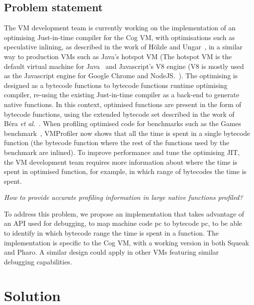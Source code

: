\documentclass[10pt,preprint,nonatbib]{sigplanconf}
\newcommand{\etal}{\emph{et al.}\xspace}
\begin{document}
\subsection{Problem statement}

The VM development team is currently working on the implementation of an optimising Just-in-time compiler for the Cog VM, with optimisations such as speculative inlining, as described in the work of H\"olzle and Ungar~\cite{Holz94a}, in a similar way to production VMs such as Java's hotspot VM (The hotspot VM is the default virtual machine for Java~\cite{Pale01a} and Javascript's V8 engine (V8 is mostly used as the Javascript engine for Google Chrome and NodeJS.~\cite{V8}). The optimising is designed as a bytecode functions to bytecode functions runtime optimising compiler, re-using the existing Just-in-time compiler as a back-end to generate native functions. In this context, optimised functions are present in the form of bytecode functions, using the extended bytecode set described in the work of B\'era \etal~\cite{Bera14a}. When profiling optimised code for benchmarks such as the Games benchmark~\cite{GameBenchs}, VMProfiler now shows that all the time is spent in a single bytecode function (the bytecode function where the rest of the functions used by the benchmark are inlined). To improve performance and tune the optimising JIT, the VM development team requires more information about where the time is spent in optimised function, for example, in which range of bytecodes the time is spent.

\vspace{0.2cm}
\emph{How to provide accurate profiling information in large native functions profiled?}
\vspace{0.2cm}

To address this problem, we propose an implementation that takes advantage of an API used for debugging, to map machine code pc to bytecode pc, to be able to identify in which bytecode range the time is spent in a function. The implementation is specific to the Cog VM, with a working version in both Squeak and Pharo. A similar design could apply in other VMs featuring similar debugging capabilities.


\section{Solution}
\end{document}
